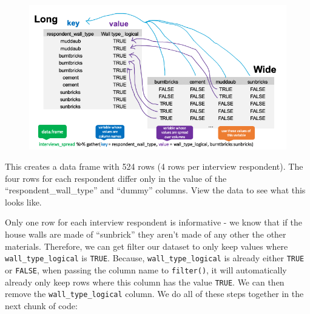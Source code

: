 \documentclass[]{book}
\newenvironment{Shaded}{\begin{snugshade}}{\end{snugshade}}
\newcommand{\KeywordTok}[1]{\textcolor[rgb]{0.13,0.29,0.53}{\textbf{#1}}}
\newcommand{\DataTypeTok}[1]{\textcolor[rgb]{0.13,0.29,0.53}{#1}}
\newcommand{\StringTok}[1]{\textcolor[rgb]{0.31,0.60,0.02}{#1}}
\newcommand{\OperatorTok}[1]{\textcolor[rgb]{0.81,0.36,0.00}{\textbf{#1}}}
\newcommand{\NormalTok}[1]{#1}
\begin{document}
\begin{Shaded}
\end{Shaded}

\begin{figure}
\centering
\includegraphics{./fig/wide_to_long.png}
\caption{}
\end{figure}

This creates a data frame with 524 rows (4 rows per interview
respondent). The four rows for each respondent differ only in the value
of the ``respondent\_wall\_type'' and ``dummy'' columns. View the data
to see what this looks like.

Only one row for each interview respondent is informative - we know that
if the house walls are made of ``sunbrick'' they aren't made of any
other the other materials. Therefore, we can get filter our dataset to
only keep values where \texttt{wall\_type\_logical} is \texttt{TRUE}.
Because, \texttt{wall\_type\_logical} is already either \texttt{TRUE} or
\texttt{FALSE}, when passing the column name to \texttt{filter()}, it
will automatically already only keep rows where this column has the
value \texttt{TRUE}. We can then remove the \texttt{wall\_type\_logical}
column. We do all of these steps together in the next chunk of code:

\begin{Shaded}
\end{Shaded}
\end{document}
